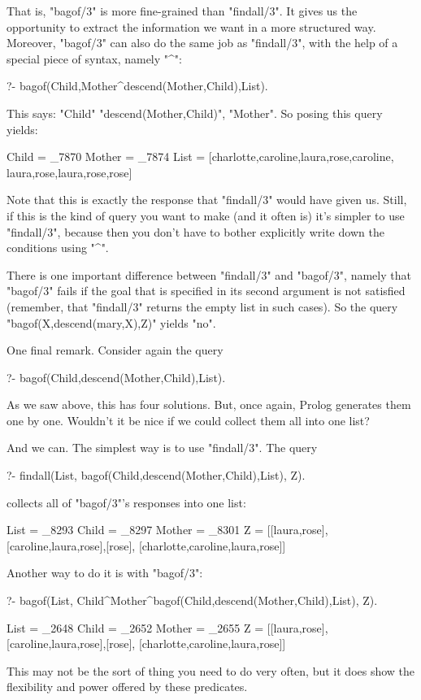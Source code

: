 That is, "bagof/3" is more fine-grained than "findall/3". It gives us the
opportunity to extract the information we want in a more structured
way.  Moreover, "bagof/3" can also do the same job as "findall/3", with the
help of a special piece of syntax, namely "^":
\begin{LPNcodedisplay}
?- bagof(Child,Mother^descend(Mother,Child),List).
\end{LPNcodedisplay}
This says:  "Child"
 "descend(Mother,Child)",  "Mother".  So posing this query yields:
\begin{LPNcodedisplay}
Child = _7870
Mother = _7874
List = [charlotte,caroline,laura,rose,caroline,
        laura,rose,laura,rose,rose]
\end{LPNcodedisplay}
Note that this is exactly the response that "findall/3" would have
given us. Still, if this is the
kind of query you want to make (and it often is) it's simpler to use
"findall/3", because then you don't have to bother explicitly write
down the conditions using "^".

There is one important difference between "findall/3"
and "bagof/3", namely that "bagof/3" fails if the
goal that is specified in its second argument is not satisfied
(remember, that "findall/3" returns the empty list in such
cases). So the query
"bagof(X,descend(mary,X),Z)" yields "no".

One final remark. Consider again the query
\begin{LPNcodedisplay}
?- bagof(Child,descend(Mother,Child),List).
\end{LPNcodedisplay}
As we saw above, this has four solutions. But, once again, Prolog
generates them one by one. Wouldn't it be nice if
we could collect them all into one list?

And we can. The simplest way is to use "findall/3".  The query
\begin{LPNcodedisplay}
?- findall(List,
           bagof(Child,descend(Mother,Child),List),
           Z).
\end{LPNcodedisplay}
collects all of "bagof/3"'s responses into one list:
\begin{LPNcodedisplay}
List = _8293
Child = _8297
Mother = _8301
Z = [[laura,rose],[caroline,laura,rose],[rose],
                  [charlotte,caroline,laura,rose]]
\end{LPNcodedisplay}
Another way to do it is with "bagof/3":
\begin{LPNcodedisplay}
?- bagof(List,
   Child^Mother^bagof(Child,descend(Mother,Child),List),
   Z).

List = _2648
Child = _2652
Mother = _2655
Z = [[laura,rose],[caroline,laura,rose],[rose],
                  [charlotte,caroline,laura,rose]]
\end{LPNcodedisplay}
This may not be the sort of thing you need to do very often, but
it does show the flexibility and power offered by these predicates.



